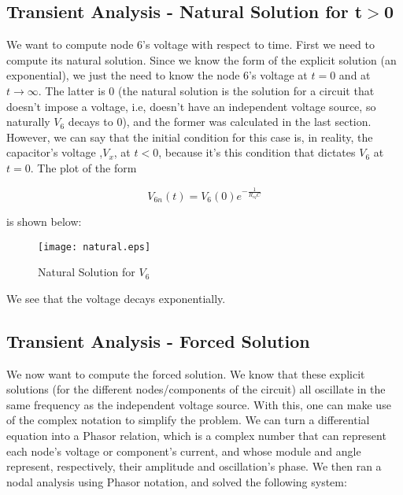 \subsection{ Transient Analysis - Natural Solution for t$>$0}
We want to compute node 6's voltage with respect to time. First we need to compute its natural solution. Since we know the form of the explicit solution  (an exponential), we just the need to know the node 6's voltage at $t=0$ and at $t \to \infty $.
The latter is $0$ (the natural solution is the solution for a circuit that doesn't impose a voltage, i.e, doesn't have an independent voltage source, so naturally $V_{6}$ decays to $0$), and the former was calculated in the last section. However, we can say that
the initial condition for this case is, in reality, the capacitor's voltage ,$V_x$, at $t<0$, because it's this condition that dictates $V_6$ at $t=0$. The plot of the form


\begin{center}
\begin{equation}
V_{6n}(t)=V_6(0) e^{-\frac{1}{R_{eq}C}}
\label{ExplicitNaturalSolution}
\end{equation}
\end{center}
is shown below:

\begin{figure}[H]
  \centering
  \texttt{[image: natural.eps]}
  \caption{Natural Solution for $V_{6}$}
  \label{fig:OctaveNaturalSolution}
\end{figure}

We see that the voltage decays exponentially.
\subsection{Transient Analysis - Forced Solution}
We now want to compute the forced solution. We know that these explicit solutions (for the different nodes/components of the circuit) all oscillate in the same frequency as the independent voltage source. With this, one can make use of the complex notation to
simplify the problem. We can turn a differential equation into a Phasor relation, which is a complex number that can represent each node's voltage or component's current, and whose module and angle represent, respectively, their amplitude and oscillation's phase.
We then ran a nodal analysis using Phasor notation, and solved the following system:

